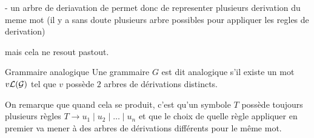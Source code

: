 \documentclass[a4paper,french,bookmarks]{book}
\begin{document}
    \qquad    - un arbre de deriavation de permet donc de representer plusieurs derivation du meme mot (il y a sans doute plusieurs arbre possibles pour appliquer les regles de derivation)
    
    mais cela ne resout pastout.
    
    \begin{definition}{Grammaire analogique}{}
        Une grammaire $G$ est dit analogique s'il existe un mot $v \mathcal{L}\!\left(\mathcal{G}\right)$ tel que $v$ possède $2$ arbres de dérivations distincts.
    \end{definition}

    On remarque que quand cela se produit, c'est qu'un symbole $T$ possède toujours plusieurs règles $T \to u_1 \mid u_2 \mid \dots \mid u_n$ et que le choix de quelle règle appliquer en premier va mener à des arbres de dérivations différents pour le même mot.
\end{document}
